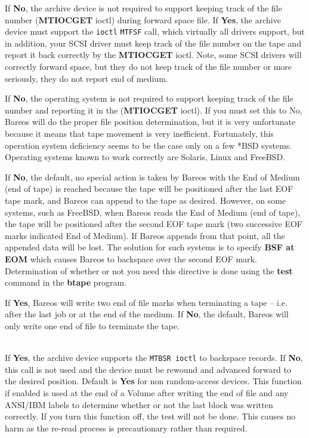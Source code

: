 \begin{description}
If {\bf No}, the archive device is not required to support  keeping track of
the file number ({\bf MTIOCGET} ioctl) during  forward space file. If {\bf
Yes}, the archive device must support  the {\tt ioctl} {\tt MTFSF} call, which
virtually all drivers  support, but in addition, your SCSI driver must keep
track of the  file number on the tape and report it back correctly by the
{\bf MTIOCGET} ioctl. Note, some SCSI drivers will correctly  forward space,
but they do not keep track of the file number or more  seriously, they do not
report end of medium.

If {\bf No}, the operating system is not required to support keeping track of
the file number and reporting it in the ({\bf MTIOCGET} ioctl).
If you must set this to No, Bareos will do the proper file
position determination, but it is very unfortunate because it means that
tape movement is very inefficient.
Fortunately, this operation system deficiency seems to be the case only
on a few *BSD systems.  Operating systems known to work correctly are
Solaris, Linux and FreeBSD.

If {\bf No}, the default, no special action is taken by Bareos with the End
of Medium (end of tape) is reached because the tape will be positioned after
the last EOF tape mark, and Bareos can append to the tape as desired.
However, on some systems, such as FreeBSD, when Bareos reads the End of
Medium (end of tape), the tape will be positioned after the second EOF tape
mark (two successive EOF marks indicated End of Medium). If Bareos appends
from that point, all the appended data will be lost. The solution for such
systems is to specify {\bf BSF at EOM} which causes Bareos to backspace over
the second EOF mark. Determination of whether or not you need this directive
is done using the {\bf test} command in the {\bf btape} program.

If {\bf Yes}, Bareos will write two end of file marks when terminating a
tape -- i.e. after the last job or at the end of the medium. If {\bf No},
the default, Bareos will only write one end of file to terminate the tape.

\item [Backward Space Record = {\textless}yes{\textbar}no{\textgreater}] \hfill \\
If {\bf Yes}, the archive device supports the {\tt MTBSR ioctl} to backspace
records. If {\bf No}, this call is not used and the device must be rewound
and advanced forward to the desired position. Default is {\bf Yes} for non
random-access devices. This function if enabled is used at the end of a
Volume after writing the end of file and any ANSI/IBM labels to determine
whether or not the last block was written correctly. If you turn this
function off, the test will not be done. This causes no harm as the re-read
process is precautionary rather than required.


\end{description}
